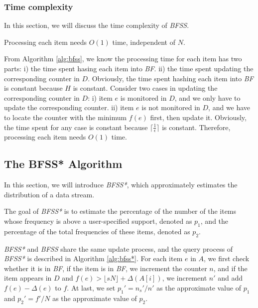 \documentclass[conference]{IEEEtran}
\begin{document}
\subsubsection{\textbf{Time complexity}}
In this section, we will discuss the time complexity of \emph{BFSS}.

\begin{theorem}\label{thm:5}
Processing each item needs $O(1)$ time, independent of $N$.
\end{theorem}

\begin{IEEEproof}
From Algorithm \ref{alg:bfss}, we know the processing time for each item has two parts: i) the time spent hasing each item into \emph{BF}. ii) the time spent updating the corresponding counter in $D$. Obviously, the time spent hashing each item into \emph{BF} is constant because $H$ is constant. Consider two cases in updating the corresponding counter in $D$: i) item $e$ is monitored in $D$, and we only have to update the corresponding counter. ii) item $e$ is not monitored in $D$, and we have to locate the counter with the minimum $f(e)$ first, then update it. Obviously, the time spent for any case is constant because $\lceil \frac{1}{\epsilon}\rceil$ is constant. Therefore, processing each item needs $O(1)$ time.
\end{IEEEproof}


\subsection{The BFSS* Algorithm}
In this section, we will introduce \emph{BFSS*}, which approximately estimates the distribution of a data stream.\par
The goal of \emph{BFSS*} is to estimate the percentage of the number of the items whose frequency is above a user-specified support, denoted as $p_1$, and the percentage of the total frequencies of these items, denoted as $p_2$.\par 
\emph{BFSS*} and \emph{BFSS} share the same update process, and the query process of \emph{BFSS*} is described in Algorithm \ref{alg:bfss*}. For each item $e$ in $A$, we first check whether it is in \emph{BF}, if the item is in \emph{BF}, we increment the counter $n$, and if the item appears in $D$ and $f(e)>\lfloor sN\rfloor+\Delta(A[i])$, we increment $n'$ and add $f(e)-\Delta(e)$ to $f$. At last, we set $p_1'=n_s'/n'$ as the approximate value of $p_1$ and $p_2'=f'/N$ as the approximate value of $p_2$.
\end{document}
